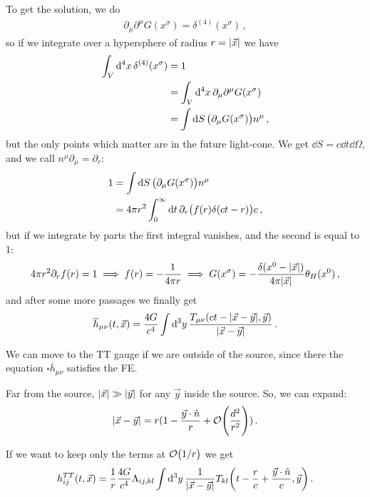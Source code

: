 \documentclass[main.tex]{subfiles}
\begin{document}
To get the solution, we do 
%
\begin{align}
\partial_{\mu } \partial^{\mu } G(x^{\sigma }) = \delta^{(4)} (x^{\sigma })
\,,
\end{align}
%
so if we integrate over a hypersphere of radius \(r = \abs{\vec{x}}\) we have 
%
\begin{align}
\int_V \dd[4]{x} \delta^{(4)} (x^{\sigma }) &= 1  \\
&= \int_{V} \dd[4]{x} \partial_{\mu } \partial^{\mu } G(x^{\sigma })  \\
&= \int \dd{S} \qty(\partial_{\mu } G(x^{\sigma })) n^{\mu } 
\,,
\end{align}
%
but the only points which matter are in the future light-cone. We get \(\dd{S} = c \dd{t}  \dd{\Omega }\), and we call \(n^{\mu } \partial_{\mu } = \partial_{r}\): 
%
\begin{align}
1 &= \int \dd{S} \qty(\partial_{\mu } G(x^{\sigma })) n^{\mu }  \\
&= 4 \pi r^2 \int_0^{ \infty } \dd{t} \partial_{r} \qty(f(r) \delta (ct-r) )c
\,,
\end{align}
%
but if we integrate by parts the first integral vanishes, and the second is equal to 1: 
%
\begin{align}
4 \pi r^2 \partial_{r} f(r) = 1 \implies 
f(r) = - \frac{1}{4 \pi r}
\implies G(x^{\sigma }) = - \frac{ \delta (x^{0} - \abs{\vec{x}})}{4 \pi \abs{\vec{x}}} \theta_H (x^{0})
\,,
\end{align}
%
and after some more passages we finally get 
%
\begin{align}
\overline{h}_{\mu \nu } 
(t, \vec{x}) = 
\frac{4G}{c^{4}}
\int \dd[3]{y} \frac{T_{\mu \nu } (ct - \abs{\vec{x}-\vec{y}}, \vec{y})}{\abs{\vec{x} - \vec{y}}}
\,.
\end{align}

We can move to the TT gauge if we are outside of the source, since there the equation \(\square \overline{h}_{\mu \nu }\) satisfies the FE. 

Far from the source, \(\abs{\vec{x}} \gg \abs{\vec{y}}\) for any \(\vec{y}\) inside the source. So, we can expand: 
%
\begin{align}
\abs{\vec{x} - \vec{y}} = r (1 - \frac{\vec{y} \cdot \hat{n}}{r} + \order{\frac{d^2}{r^2}})
\,.
\end{align}

If we want to keep only the terms at \(\order{1/r}\) we get 
%
\begin{align}
h_{ij}^{TT} (t, \vec{x}) = \frac{1}{r} \frac{4G}{c^{4}}
\Lambda_{ij, kl} \int \dd[3]{y} \frac{1}{\abs{\vec{x} - \vec{y}}}
T_{kl} \qty(t - \frac{r}{c} + \frac{\vec{y} \cdot \hat{n}}{c}, \vec{y})
\,.
\end{align}
\end{document}
